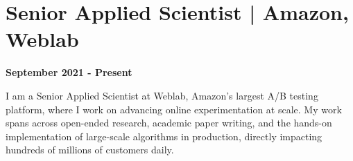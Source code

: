 \documentclass[10pt, a4paper]{article}
\begin{document}

\section*{Senior Applied Scientist | Amazon, Weblab}
\textbf{September 2021 - Present} 

I am a Senior Applied Scientist at Weblab, Amazon’s largest A/B testing platform, where I work on advancing online experimentation at scale. My work spans across open-ended research, academic paper writing, and the hands-on implementation of large-scale algorithms in production, directly impacting hundreds of millions of customers daily. 
\end{document}
